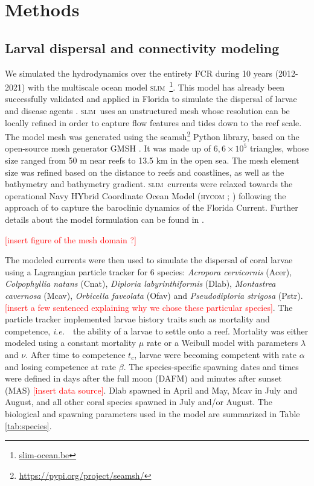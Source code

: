 \documentclass[preprint,12pt,authoryear]{elsarticle}
\newcommand{\hycom}{\textsc{hycom} }
\newcommand{\slim}{\textsc{slim}\ }
\newcommand{\ie}{{\it i.e.}\ }
\begin{document}

\section*{Methods}

\subsection*{Larval dispersal and connectivity modeling}

We simulated the hydrodynamics over the entirety FCR during 10 years (2012-2021) with the multiscale ocean model \slim\footnote{\href{ https://www.slim-ocean.be}{slim-ocean.be}}. This model has already been successfully validated and applied in Florida to simulate the dispersal of larvae and disease agents \citep{frys2020fine,dobbelaere2020coupled}. \slim uses an unstructured mesh whose resolution can be locally refined in order to capture flow features and tides down to the reef scale. The model mesh was generated using the seamsh\footnote{\href{https://pypi.org/project/seamsh/}{https://pypi.org/project/seamsh/}} Python library, based on the open-source mesh generator GMSH \citep{geuzaine2009gmsh}. It was made up of $6,6\times 10^5$ triangles, whose size ranged from 50 m near reefs to 13.5 km in the open sea. The mesh element size was refined based on the distance to reefs and coastlines, as well as the bathymetry and bathymetry gradient. \slim currents were relaxed towards the operational Navy HYbrid Coordinate Ocean Model (\hycom; \citealp{chassignet2007hycom}) following the approach of \citep{dobbelaere2022impacts} to capture the baroclinic dynamics of the Florida Current. Further details about the model formulation can be found in \citep{frys2020fine}.

\textcolor{red}{[insert figure of the mesh domain ?]}

The modeled currents were then used to simulate the dispersal of coral larvae using a Lagrangian particle tracker for 6 species: \textit{Acropora cervicornis} (Acer), \textit{Colpophyllia natans} (Cnat), \textit{Diploria labyrinthiformis} (Dlab), \textit{Montastrea cavernosa} (Mcav), \textit{Orbicella faveolata} (Ofav) and \textit{Pseudodiploria strigosa} (Pstr). \textcolor{red}{[insert a few sentenced explaining why we chose these particular species]}. The particle tracker implemented larvae history traits such as mortality and competence, \ie~the ability of a larvae to settle onto a reef. Mortality was either modeled using a constant mortality $\mu$ rate or a Weibull model \citep{king2023larval} with parameters $\lambda$ and $\nu$. After time to competence $t_c$, larvae were becoming competent with rate $\alpha$ and losing competence at rate $\beta$. The species-specific spawning dates and times were defined in days after the full moon (DAFM) and minutes after sunset (MAS) \textcolor{red}{[insert data source]}. Dlab spawned in April and May, Mcav in July and August, and all other coral species spawned in July and/or August. The biological and spawning parameters used in the model are summarized in Table \ref{tab:species}.
\end{document}
